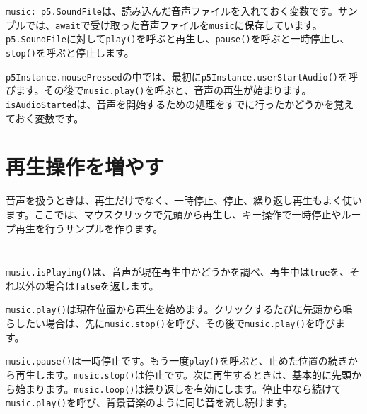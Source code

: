 \texttt{music: p5.SoundFile}は、読み込んだ音声ファイルを入れておく変数です。サンプルでは、\texttt{await}で受け取った音声ファイルを\texttt{music}に保存しています。\texttt{p5.SoundFile}に対して\texttt{play()}を呼ぶと再生し、\texttt{pause()}を呼ぶと一時停止し、\texttt{stop()}を呼ぶと停止します。

\texttt{p5Instance.mousePressed}の中では、最初に\texttt{p5Instance.userStartAudio()}を呼びます。その後で\texttt{music.play()}を呼ぶと、音声の再生が始まります。\texttt{isAudioStarted}は、音声を開始するための処理をすでに行ったかどうかを覚えておく変数です。

\section{再生操作を増やす}

音声を扱うときは、再生だけでなく、一時停止、停止、繰り返し再生もよく使います。ここでは、マウスクリックで先頭から再生し、キー操作で一時停止やループ再生を行うサンプルを作ります。

\begin{listing}[htbp]
\inputminted[firstline=1,lastline=33]{ts}{typescript-p5/listings/chapter17/sound-controls.ts}
\caption{音声操作のための変数と画面表示（\texttt{chapter17/sound-controls.ts}）}
\label{lst:chapter17-sound-controls-display}
\end{listing}

\begin{listing}[htbp]
\inputminted[firstline=35,lastline=65]{ts}{typescript-p5/listings/chapter17/sound-controls.ts}
\caption{再生、一時停止、繰り返し、停止の操作（\texttt{chapter17/sound-controls.ts}）}
\label{lst:chapter17-sound-controls-input}
\end{listing}

\texttt{music.isPlaying()}は、音声が現在再生中かどうかを調べ、再生中は\texttt{true}を、それ以外の場合は\texttt{false}を返します。

\texttt{music.play()}は現在位置から再生を始めます。クリックするたびに先頭から鳴らしたい場合は、先に\texttt{music.stop()}を呼び、その後で\texttt{music.play()}を呼びます。

\texttt{music.pause()}は一時停止です。もう一度\texttt{play()}を呼ぶと、止めた位置の続きから再生します。\texttt{music.stop()}は停止です。次に再生するときは、基本的に先頭から始まります。\texttt{music.loop()}は繰り返しを有効にします。停止中なら続けて\texttt{music.play()}を呼び、背景音楽のように同じ音を流し続けます。

